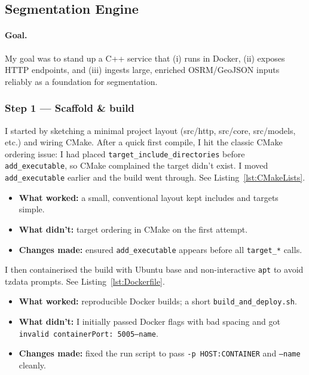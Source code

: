 \documentclass[11pt,twoside]{report}
\begin{document}
\subsection{Segmentation Engine}

\paragraph{Goal.}
My goal was to stand up a C++ service that (i) runs in Docker, (ii) exposes HTTP endpoints, and (iii) ingests large, enriched OSRM/GeoJSON inputs reliably as a foundation for segmentation.

\subsubsection*{Step 1 — Scaffold \& build}
I started by sketching a minimal project layout (src/http, src/core, src/models, etc.) and wiring CMake. After a quick first compile, I hit the classic CMake ordering issue: I had placed \texttt{target\_include\_directories} before \texttt{add\_executable}, so CMake complained the target didn’t exist. I moved \texttt{add\_executable} earlier and the build went through. See Listing~\ref{lst:CMakeLists}.

\begin{itemize}
	\item \textbf{What worked:} a small, conventional layout kept includes and targets simple.
	\item \textbf{What didn’t:} target ordering in CMake on the first attempt.
	\item \textbf{Changes made:} ensured \texttt{add\_executable} appears before all \texttt{target\_*} calls.
\end{itemize}

I then containerised the build with Ubuntu base and non-interactive \texttt{apt} to avoid tzdata prompts. See Listing~\ref{lst:Dockerfile}.

\begin{itemize}
	\item \textbf{What worked:} reproducible Docker builds; a short \texttt{build\_and\_deploy.sh}.
	\item \textbf{What didn’t:} I initially passed Docker flags with bad spacing and got \texttt{invalid containerPort: 5005--name}.
	\item \textbf{Changes made:} fixed the run script to pass \texttt{-p HOST:CONTAINER} and \texttt{--name} cleanly.
\end{itemize}
\end{document}
